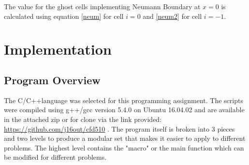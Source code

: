 \documentclass[paper=a4, fontsize=11pt, abstract=on]{scrartcl}
\numberwithin{equation}{section}		%
\numberwithin{figure}{section}			%
\numberwithin{table}{section}				%
\begin{document}
The value for the ghost cells implementing Neumann Boundary at $x=0$ is calculated using equation \ref{neum} for cell $i = 0$ and \ref{neum2} for cell $i = -1$.
 


\section{Implementation}
\subsection{Program Overview}
The C/C++language was selected for this programming assignment. The scripts were compiled using g++/gcc version 5.4.0 on Ubuntu 16.04.02 and are available in the attached zip or for clone via the link provided: \url{https://github.com/j16out/cfd510} . The program itself is broken into 3 pieces and two levels to produce a modular set that makes it easier to apply to different problems. The highest level contains the "macro" or the main function which can be modified for different problems. 
\end{document}
